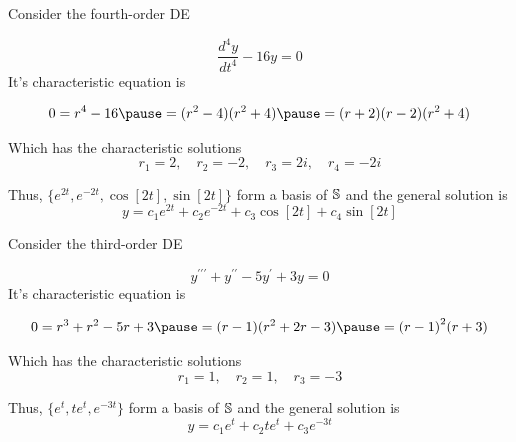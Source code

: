 \documentclass{beamer}
\begin{document}
\begin{frame}
\begin{example}
Consider the fourth-order DE

\vspace{-1mm}
\begin{equation*}
\dfrac{d^4 y}{dt^4}-16y=0
\end{equation*}\pause
It's characteristic equation is

\vspace{-1mm}
\begin{equation*}
\begin{aligned}
0=r^4-16\pause
=(r^2-4)(r^2+4)\pause
=(r+2)(r-2)(r^2+4)
\end{aligned}
\end{equation*}\pause

\vspace{-3mm}
Which has the characteristic solutions
\begin{equation*}
r_1 = 2  , \quad r_2  = -2 , \quad r_3 = 2i , \quad r_4  = -2i
\end{equation*}\pause

\vspace{-3mm}
Thus, $\{e^{2t},e^{-2t},\cos[2t],\sin[2t]\}$ form a basis of $\mathbb{S}$ and the general solution is
\begin{equation*}
y=c_1e^{2t}+c_2e^{-2t}+c_3\cos[2t]+c_4\sin[2t]
\end{equation*}
\end{example}
\end{frame}

\begin{frame}
\begin{example}
Consider the third-order DE

\vspace{-1mm}
\begin{equation*}
y^{\prime\prime\prime}+y^{\prime\prime}-5y^{\prime}+3y=0
\end{equation*}\pause
It's characteristic equation is

\vspace{-1mm}
\begin{equation*}
\begin{aligned}
0=r^3+r^2-5r+3\pause
=(r-1)(r^2+2r-3)\pause
={(r-1)}^2(r+3)
\end{aligned}
\end{equation*}\pause

\vspace{-3mm}
Which has the characteristic solutions
\begin{equation*}
r_1=1, \quad r_2=1, \quad r_3=-3
\end{equation*}\pause

\vspace{-3mm}
Thus, $\{e^{t},te^{t},e^{-3t}\}$ form a basis of $\mathbb{S}$ and the general solution is
\begin{equation*}
y=c_1e^{t}+c_2te^{t}+c_3e^{-3t}
\end{equation*}
\end{example}
\end{frame}
\end{document}
